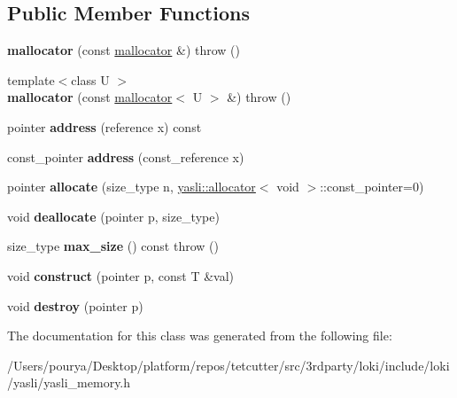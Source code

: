 \subsection*{Public Member Functions}
\begin{DoxyCompactItemize}
\item 
\hypertarget{classyasli__nstd_1_1mallocator_a52b224a8798efd9df95f9a60bf9ca5a4}{}{\bfseries mallocator} (const \hyperlink{classyasli__nstd_1_1mallocator}{mallocator} \&)  throw ()\label{classyasli__nstd_1_1mallocator_a52b224a8798efd9df95f9a60bf9ca5a4}

\item 
\hypertarget{classyasli__nstd_1_1mallocator_a0de330e99b6394dc783e3dfaf718d7d5}{}{\footnotesize template$<$class U $>$ }\\{\bfseries mallocator} (const \hyperlink{classyasli__nstd_1_1mallocator}{mallocator}$<$ U $>$ \&)  throw ()\label{classyasli__nstd_1_1mallocator_a0de330e99b6394dc783e3dfaf718d7d5}

\item 
\hypertarget{classyasli__nstd_1_1mallocator_ac6b72b1093f6ecd703900429775cf7f3}{}pointer {\bfseries address} (reference x) const \label{classyasli__nstd_1_1mallocator_ac6b72b1093f6ecd703900429775cf7f3}

\item 
\hypertarget{classyasli__nstd_1_1mallocator_aa1a3d79c96066c23e77a40f70b702689}{}const\+\_\+pointer {\bfseries address} (const\+\_\+reference x)\label{classyasli__nstd_1_1mallocator_aa1a3d79c96066c23e77a40f70b702689}

\item 
\hypertarget{classyasli__nstd_1_1mallocator_a98a9b86715a54363a7e8e75afe2aec26}{}pointer {\bfseries allocate} (size\+\_\+type n, \hyperlink{classyasli_1_1allocator}{yasli\+::allocator}$<$ void $>$\+::const\+\_\+pointer=0)\label{classyasli__nstd_1_1mallocator_a98a9b86715a54363a7e8e75afe2aec26}

\item 
\hypertarget{classyasli__nstd_1_1mallocator_ad733cf49b3425b417725cea593f521c0}{}void {\bfseries deallocate} (pointer p, size\+\_\+type)\label{classyasli__nstd_1_1mallocator_ad733cf49b3425b417725cea593f521c0}

\item 
\hypertarget{classyasli__nstd_1_1mallocator_a75754446bf0e30036be9101adda19964}{}size\+\_\+type {\bfseries max\+\_\+size} () const   throw ()\label{classyasli__nstd_1_1mallocator_a75754446bf0e30036be9101adda19964}

\item 
\hypertarget{classyasli__nstd_1_1mallocator_ad4d384850c9760589739417a53fa7195}{}void {\bfseries construct} (pointer p, const T \&val)\label{classyasli__nstd_1_1mallocator_ad4d384850c9760589739417a53fa7195}

\item 
\hypertarget{classyasli__nstd_1_1mallocator_a238485f67feb34e414dff17367f9d1e8}{}void {\bfseries destroy} (pointer p)\label{classyasli__nstd_1_1mallocator_a238485f67feb34e414dff17367f9d1e8}

\end{DoxyCompactItemize}


The documentation for this class was generated from the following file\+:\begin{DoxyCompactItemize}
\item 
/\+Users/pourya/\+Desktop/platform/repos/tetcutter/src/3rdparty/loki/include/loki/yasli/yasli\+\_\+memory.\+h\end{DoxyCompactItemize}
